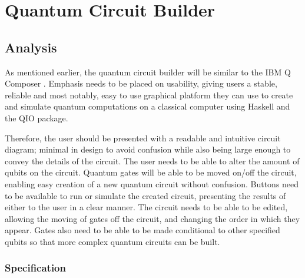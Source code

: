 \documentclass[a4paper,10pt, titlepage, twoside]{article}
\begin{document}
\section{Quantum Circuit Builder}
\subsection{Analysis}
As mentioned earlier, the quantum circuit builder will be similar to the IBM Q Composer \cite{ibmqexperience}. Emphasis needs to be placed on usability, giving users a stable, reliable and most notably, easy to use graphical platform they can use to create and simulate quantum computations on a classical computer using Haskell and the QIO package.\par
Therefore, the user should be presented with a readable and intuitive circuit diagram; minimal in design to avoid confusion while also being large enough to convey the details of the circuit. The user needs to be able to alter the amount of qubits on the circuit. Quantum gates will be able to be moved on/off the circuit, enabling easy creation of a new quantum circuit without confusion. Buttons need to be available to run or simulate the created circuit, presenting the results of either to the user in a clear manner. The circuit needs to be able to be edited, allowing the moving of gates off the circuit, and changing the order in which they appear. Gates also need to be able to be made conditional to other specified qubits so that more complex quantum circuits can be built.

\subsubsection{Specification}
\end{document}

